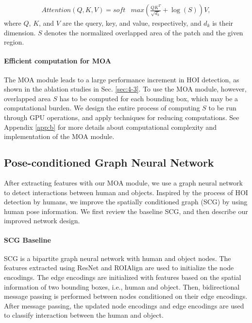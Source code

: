 \documentclass[10pt,twocolumn,letterpaper]{article}
\begin{document}
\begin{align}
    \label{eq:1}
    Attention(Q,K,V) = soft&max(\frac{QK^{T}}{\sqrt{d_{k}}} + \log(S))V,
\end{align}
where $Q$, $K$, and $V$ are the query, key, and value, respectively, and $d_{k}$ is their dimension. $S$ 
denotes the normalized overlapped area of the patch and the given region.


\paragraph {Efficient computation for MOA}
The MOA module leads to a large performance increment in HOI detection, as shown in the ablation studies in Sec. \ref{sec:4-3}. To use the MOA module, however, overlapped area $S$ has to be computed for each bounding box, which may be a computational burden. We design the entire process of computing $S$ to be run through GPU operations, and apply techniques for reducing computations. See Appendix \ref{app:b} for more details about computational complexity and implementation of the MOA module.  





 
\subsection{Pose-conditioned Graph Neural Network}
\label{sec:3-2}
After extracting features with our MOA module, we use a graph neural network to detect interactions between human and objects. Inspired by the process of HOI detection by humans, we improve the spatially conditioned graph (SCG) \cite{zhang2021spatially} by using human pose information. We first review the baseline SCG, and then describe our improved network design.

\paragraph {SCG Baseline}
SCG is a bipartite graph neural network with human and object nodes. The features extracted using ResNet and ROIAlign are used to initialize the node encodings. The edge encodings are initialized with features based on the spatial information of two bounding boxes, i.e., human and object. Then, bidirectional message passing is performed between nodes conditioned on their edge encodings. After message passing, the updated node encodings and edge encodings are used to classify interaction between the human and object. 
\end{document}
